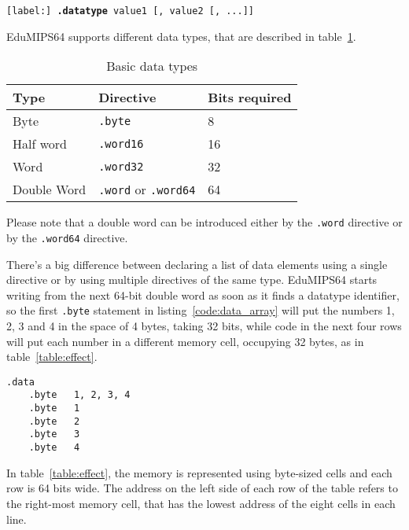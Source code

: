 \documentclass[12pt]{report}
\newcommand{\EM}{EduMIPS64}
\begin{document}
\begin{center}
	\texttt{[label:] \textbf{.datatype} value1 [, value2 [, ...]]}
\end{center}

\EM{} supports different data types, that are described in
table~\ref{table:datatypes}.

\begin{table}[!htb]
	\begin{centering}
		\begin{tabular}{lll}
			\hline
			\hline
			Type & Directive & Bits required\\
			\hline
			Byte & \texttt{.byte} & 8\\
			Half word & \texttt{.word16} & 16\\
			Word & \texttt{.word32} & 32\\
			Double Word & \texttt{.word} or \texttt{.word64} & 64
		\end{tabular}
		\caption{Basic data types}
		\label{table:datatypes}
	\end{centering}
\end{table}

Please note that a double word can be introduced either by the \texttt{.word}
directive or by the \texttt{.word64} directive.

 There's a big difference between declaring a list of data elements
using a single directive or by using multiple directives of the same type. \EM{}
starts writing from the next 64-bit double word as soon as it finds a datatype identifier,
so the first \texttt{.byte} statement in listing~\ref{code:data_array} will put
the numbers 1, 2, 3 and 4 in the space of 4 bytes, taking 32 bits, while code in
the next four rows will put each number in a different memory cell, occupying 32
bytes, as in table~\ref{table:effect}.

\begin{lstlisting}[caption={Adjacent bytes}, label={code:data_array}, style={mips}]
	.data
	.byte	1, 2, 3, 4
	.byte	1
	.byte	2
	.byte	3
	.byte	4
\end{lstlisting}

In table~\ref{table:effect}, the memory is represented using byte-sized cells
and each row is 64 bits wide. The address on the left side of each row of the
table refers to the right-most memory cell, that has the lowest address of the
eight cells in each line.
\end{document}
